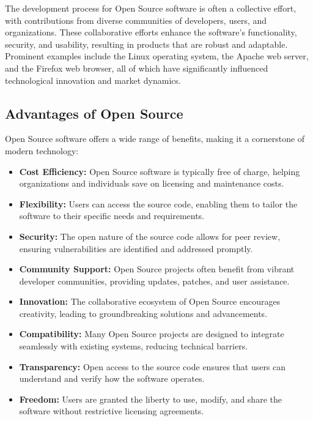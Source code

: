 The development process for Open Source software is often a collective effort, 
with contributions from diverse communities of developers, users, and organizations. 
These collaborative efforts enhance the software's functionality, security, and usability, 
resulting in products that are robust and adaptable. Prominent examples include the Linux operating system, 
the Apache web server, and the Firefox web browser, all of which have significantly influenced technological innovation and market dynamics.

\cite{opensource_what_is}

\subsection{Advantages of Open Source}

Open Source software offers a wide range of benefits, making it a cornerstone of modern technology:

\begin{itemize}
    \item \textbf{Cost Efficiency:} Open Source software is typically free of charge, helping organizations and individuals save on licensing and maintenance costs.
    \item \textbf{Flexibility:} Users can access the source code, enabling them to tailor the software to their specific needs and requirements.
    \item \textbf{Security:} The open nature of the source code allows for peer review, ensuring vulnerabilities are identified and addressed promptly.
    \item \textbf{Community Support:} Open Source projects often benefit from vibrant developer communities, providing updates, patches, and user assistance.
    \item \textbf{Innovation:} The collaborative ecosystem of Open Source encourages creativity, leading to groundbreaking solutions and advancements.
    \item \textbf{Compatibility:} Many Open Source projects are designed to integrate seamlessly with existing systems, reducing technical barriers.
    \item \textbf{Transparency:} Open access to the source code ensures that users can understand and verify how the software operates.
    \item \textbf{Freedom:} Users are granted the liberty to use, modify, and share the software without restrictive licensing agreements.
\end{itemize}

